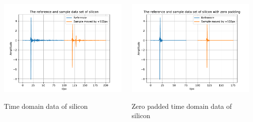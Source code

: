 \documentclass[aspectratio=1610, 9pt]{beamer}
\begin{document}
\begin{frame}
  \begin{center}
    \begin{columns}
      \begin{column}
        \includegraphics[width=\textwidth]{silicon/THz_timedomain.pdf}
        \caption{Time domain data of silicon}
      \end{column}
      \begin{column}
        \includegraphics[width=\textwidth]{silicon/THz_timedomain_zero.pdf}
        \caption{Zero padded time domain data of silicon}
      \end{column}
    \end{columns}
  \end{center}
\end{frame}
\end{document}
